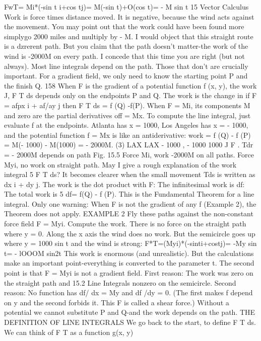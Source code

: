FwT= Mi*(-sin t i+cos tj)= M(-sin t)+O(cos t)= - M sin t 
15 Vector Calculus
Work is force times distance moved. It is negative, because the wind acts against the
movement. You may point out that the work could have been found more simplygo
2000 miles and multiply by - M. I would object that this straight route is a
dzrerent path. But you claim that the path doesn't matter-the work of the wind is
-2000M on every path. I concede that this time you are right (but not always).
Most line integrals depend on the path. Those that don't are crucially important.
For a gradient field, we only need to know the starting point P and the finish Q.
158 When F is the gradient of a potential function f (x, y), the work J, F T ds
depends only on the endpoints P and Q. The work is the change in
if F = afpx i + af/ay j then F T ds = f (Q) -f(P).
When F = Mi, its components M and zero are the partial derivatives off = Mx. To
compute the line integral, just evaluate f at the endpoints. Atlanta has x = 1000, Los
Angeles has x = - 1000, and the potential function f = Mx is like an antiderivative:
work = f (Q) - f (P) = M(- 1000) - M(1000) = - 2000M. (3)
LAX LAX - 1000 , - 1000 1000
J F . Tdr = - 2000M depends on path
Fig. 15.5 Force Mi, work -2000M on all paths. Force Myi, no work on straight path.
May I give a rough explanation of the work integral 5 F T ds? It becomes clearer
when the small movement Tds is written as dx i + dy j. The work is the dot product
with F:
The infinitesimal work is df: The total work is 5 df= f(Q) - f (P). This is the Fundamental
Theorem for a line integral. Only one warning: When F is not the gradient of any
f (Example 2), the Theorem does not apply.
EXAMPLE 2 Fly these paths against the non-constant force field F = Myi. Compute
the work.
There is no force on the straight path where y = 0. Along the x axis the wind does
no work. But the semicircle goes up where y = 1000 sin t and the wind is strong:
F*T=(Myi)*(-sinti+costj)= -My sin t= - lOOOM sin2t
This work is enormous (and unrealistic). But the calculations make an important
point-everything is converted to the parameter t. The second point is that F = Myi
is not a gradient field. First reason: The work was zero on the straight path and 
15.2 Line Integrals
nonzero on the semicircle. Second reason: No function has df/ dx = My and df /dy =
0. (The first makes f depend on y and the second forbids it. This F is called a shear
force.) Without a potential we cannot substitute P and Q-and the work depends
on the path.
THE DEFINITION OF LINE INTEGRALS
We go back to the start, to define F T ds. We can think of F T as a function g(x, y)

